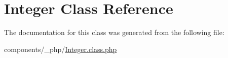 \hypertarget{class_integer}{
\section{Integer Class Reference}
\label{class_integer}
}


The documentation for this class was generated from the following file:\begin{CompactItemize}
\item 
components/\_\-php/\hyperlink{_integer_8class_8php}{Integer.class.php}\end{CompactItemize}
